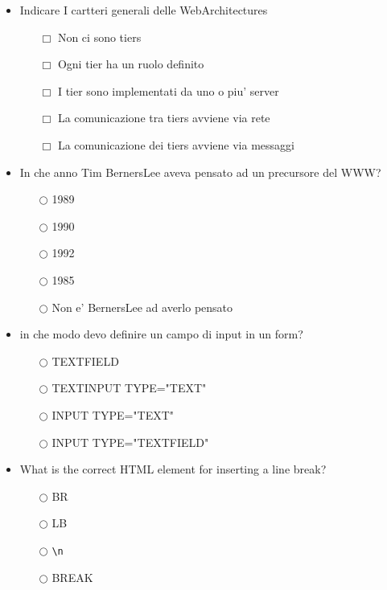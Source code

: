 \documentclass[10pt,twocolumn]{article}
\begin{document}
\begin{itemize}
    \item Indicare I cartteri generali delle WebArchitectures
          \begin{itemize}
              \item[$\Box$] Non ci sono tiers
              \item[$\Box$] Ogni tier ha un ruolo definito
              \item[$\Box$] I tier sono implementati da uno o piu' server
              \item[$\Box$] La comunicazione tra tiers avviene via rete
              \item[$\Box$] La comunicazione dei tiers avviene via messaggi
          \end{itemize}
\end{itemize}
\begin{itemize}
    \item In che anno Tim BernersLee aveva pensato ad un precursore del WWW?
          \begin{itemize}
              \item[$\bigcirc$] 1989
              \item[$\bigcirc$] 1990
              \item[$\bigcirc$] 1992
              \item[$\bigcirc$] 1985
              \item[$\bigcirc$] Non e' BernersLee ad averlo pensato
          \end{itemize}
\end{itemize}
\begin{itemize}
    \item in che modo devo definire un campo di input in un form?
          \begin{itemize}
              \item[$\bigcirc$] TEXTFIELD
              \item[$\bigcirc$] TEXTINPUT TYPE="TEXT"
              \item[$\bigcirc$] INPUT TYPE="TEXT"
              \item[$\bigcirc$] INPUT TYPE="TEXTFIELD"
          \end{itemize}
\end{itemize}
\begin{itemize}
    \item What is the correct HTML element for inserting a line break?
          \begin{itemize}
              \item[$\bigcirc$] BR
              \item[$\bigcirc$] LB
              \item[$\bigcirc$] \verb=\n=
              \item[$\bigcirc$] BREAK
          \end{itemize}
\end{itemize}
\end{document}
